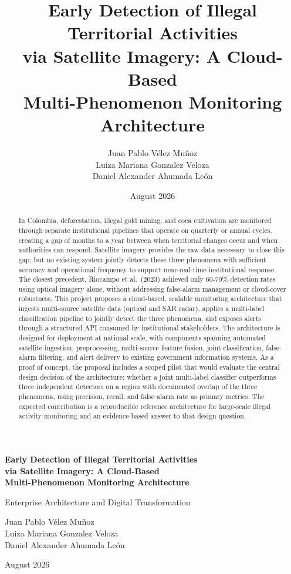\documentclass{article}
\title{%
  Early Detection of Illegal Territorial Activities\\
  via Satellite Imagery: A Cloud-Based\\
  Multi-Phenomenon Monitoring Architecture
}
\author{
  Juan Pablo Vélez Muñoz \\
  Luiza Mariana Gonzalez Veloza \\
  Daniel Alexander Ahumada León
}
\date{August 2026}
\begin{document}
\begin{titlepage}
    \centering
    \vspace*{2cm}
    {\Large \textbf{Early Detection of Illegal Territorial Activities\\
    via Satellite Imagery: A Cloud-Based\\
    Multi-Phenomenon Monitoring Architecture}\par}
    \vspace{1.5cm}
    {\Large Enterprise Architecture and Digital Transformation \par}
    \vspace{2cm}
    {\large
    Juan Pablo Vélez Muñoz \\
    Luiza Mariana Gonzalez Veloza \\
    Daniel Alexander Ahumada León
    \par}
    \vfill
    {\large August 2026 \par}
\end{titlepage}

\tableofcontents
\newpage

\begin{abstract}
In Colombia, deforestation, illegal gold mining, and coca cultivation are monitored
through separate institutional pipelines that operate on quarterly or annual cycles,
creating a gap of months to a year between when territorial changes occur and when
authorities can respond.
Satellite imagery provides the raw data necessary to close this gap, but no existing
system jointly detects these three phenomena with sufficient accuracy and operational
frequency to support near-real-time institutional response.
The closest precedent, Riocampo et al.\ (2023) achieved only 60-70\% detection
rates using optical imagery alone, without addressing false-alarm management or
cloud-cover robustness.
This project proposes a cloud-based, scalable monitoring architecture that ingests
multi-source satellite data (optical and SAR radar), applies a multi-label
classification pipeline to jointly detect the three phenomena, and exposes alerts
through a structured API consumed by institutional stakeholders.
The architecture is designed for deployment at national scale, with components
spanning automated satellite ingestion, preprocessing, multi-source feature fusion,
joint classification, false-alarm filtering, and alert delivery to existing
government information systems.
As a proof of concept, the proposal includes a scoped pilot that would evaluate
the central design decision of the architecture: whether a joint multi-label
classifier outperforms three independent detectors on a region with documented
overlap of the three phenomena, using precision, recall, and false alarm rate as
primary metrics.
The expected contribution is a reproducible reference architecture for
large-scale illegal activity monitoring and an evidence-based answer to that
design question.
\end{abstract}
\end{document}
